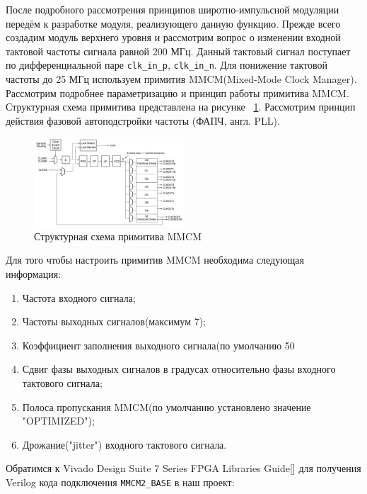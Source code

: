 \documentclass[a4paper,oneside ,10pt]{extreport}
\begin{document}
После подробного рассмотрения принципов широтно-импульсной модуляции передём к разработке модуля, реализующего данную функцию.
Прежде всего создадим модуль верхнего уровня и рассмотрим вопрос о изменении входной тактовой частоты сигнала равной 200 МГц. Данный тактовый сигнал
поступает по дифференциальной паре \verb|clk_in_p|, \verb|clk_in_n|. 
Для понижение тактовой частоты до 25 МГц используем примитив MMCM(Mixed-Mode Clock Manager).
Рассмотрим подробнее параметризацию и принцип работы примитива MMCM. Структурная схема примитива представлена 
на рисунке ~\ref{MMCM2_BASE}. Рассмотрим принцип действия фазовой автоподстройки частоты (ФАПЧ, англ. PLL).

\begin{figure}[!ht]
	\centering
	\includegraphics[width=0.5\textwidth]{image/MMCM2_BASE.PNG}
	\caption{Структурная схема примитива MMCM}
	\label{MMCM2_BASE}
\end{figure}

Для того чтобы настроить примитив MMCM необходима следующая информация:

\begin{enumerate}
	\item Частота входного сигнала;
	\item Частоты выходных сигналов(максимум 7);
	\item Коэффициент заполнения выходного сигнала(по умолчанию 50%
	\item Сдвиг фазы выходных сигналов в градусах относительно фазы входного тактового сигнала;
	\item Полоса пропускания MMCM(по умолчанию установлено значение "OPTIMIZED");
	\item Дрожание("jitter") входного тактового сигнала.
\end{enumerate}

Обратимся к Vivado Design Suite 7 Series FPGA Libraries Guide[] для получения Verilog кода подключения \verb|MMCM2_BASE| в наш проект:
\end{document}
